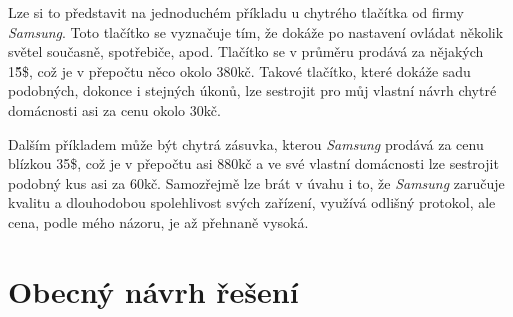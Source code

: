 Lze si to představit na jednoduchém příkladu u chytrého tlačítka od firmy \emph{Samsung}. Toto tlačítko se vyznačuje tím, že dokáže po nastavení ovládat několik světel současně, spotřebiče, apod.
Tlačítko se v průměru prodává za nějakých 15̈́\$, což je v přepočtu něco okolo 380kč. Takové tlačítko, které dokáže sadu podobných, dokonce i stejných úkonů, lze sestrojit pro můj vlastní návrh chytré domácnosti asi za cenu okolo 30kč.

Dalším příkladem může být chytrá zásuvka, kterou \emph{Samsung} prodává za cenu blízkou 35\$, což je v přepočtu asi 880kč a ve své vlastní domácnosti lze sestrojit podobný kus asi za 60kč.
Samozřejmě lze brát v úvahu i to, že \emph{Samsung} zaručuje kvalitu a dlouhodobou spolehlivost svých zařízení, využívá odlišný protokol, ale cena, podle mého názoru, je až přehnaně vysoká.

\newpage

\section*{Obecný návrh řešení}
\label{navrh:reseni}

